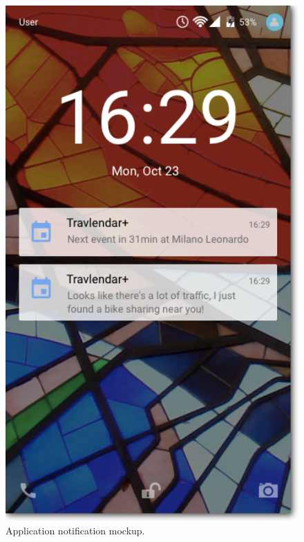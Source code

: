 \begin{figure}
	\centering
	\includegraphics[width=4.5in]{./images/lockscreen.png}
	\caption{Application notification mockup.}
	\label{fig:MockupNotifications}
\end{figure}
\vspace*{26\baselineskip}